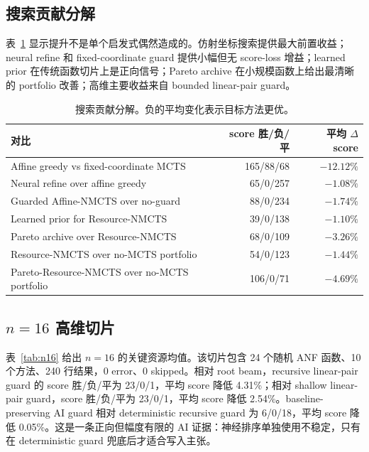 \documentclass[UTF8,fontset=macnew,11pt]{ctexart}
\newcommand{\method}{Resource-NMCTS}
\newcommand{\pareto}{Pareto-Resource-NMCTS}
\begin{document}
\subsection{搜索贡献分解}

表~\ref{tab:contribution} 显示提升不是单个启发式偶然造成的。仿射坐标搜索提供最大前置收益；neural refine 和 fixed-coordinate guard 提供小幅但无 score-loss 增益；learned prior 在传统函数切片上是正向信号；Pareto archive 在小规模函数上给出最清晰的 portfolio 改善；高维主要收益来自 bounded linear-pair guard。

\begin{table}[t]
\centering
\small
\caption{搜索贡献分解。负的平均变化表示目标方法更优。}
\label{tab:contribution}
\begin{tabularx}{\linewidth}{>{\raggedright\arraybackslash}Xrr}
\toprule
对比 & score 胜/负/平 & 平均 $\Delta$ score \\
\midrule
Affine greedy vs fixed-coordinate MCTS & 165/88/68 & $-12.12\%$ \\
Neural refine over affine greedy & 65/0/257 & $-1.08\%$ \\
Guarded Affine-NMCTS over no-guard & 88/0/234 & $-1.74\%$ \\
Learned prior for \method{} & 39/0/138 & $-1.10\%$ \\
Pareto archive over \method{} & 68/0/109 & $-3.26\%$ \\
\method{} over no-MCTS portfolio & 54/0/123 & $-1.44\%$ \\
\pareto{} over no-MCTS portfolio & 106/0/71 & $-4.69\%$ \\
\bottomrule
\end{tabularx}
\end{table}

\subsection{\texorpdfstring{$n=16$}{n=16} 高维切片}

表~\ref{tab:n16} 给出 $n=16$ 的关键资源均值。该切片包含 24 个随机 ANF 函数、10 个方法、240 行结果，0 error、0 skipped。相对 root beam，recursive linear-pair guard 的 score 胜/负/平为 23/0/1，平均 score 降低 4.31\%；相对 shallow linear-pair guard，score 胜/负/平为 23/0/1，平均 score 降低 2.54\%。baseline-preserving AI guard 相对 deterministic recursive guard 为 6/0/18，平均 score 降低 0.05\%。这是一条正向但幅度有限的 AI 证据：神经排序单独使用不稳定，只有在 deterministic guard 兜底后才适合写入主张。
\end{document}
